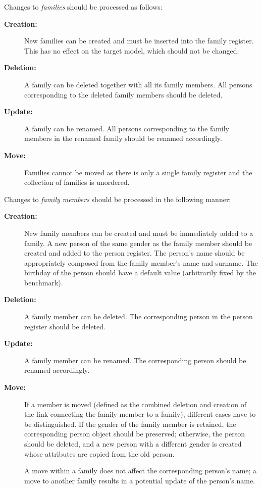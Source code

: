\medskip
\noindent Changes to \emph{families} should be processed as follows:

\begin{description}
    \item[\textbf{Creation:}]
    New families can be created and must be inserted into the family register.
    This has no effect on the target model, which should not be changed.
    
    \item[\textbf{Deletion:}]
    A family can be deleted together with all its family members.
    All persons corresponding to the deleted family members should be deleted.
    
    \item[\textbf{Update:}]
    A family can be renamed.  All persons corresponding to the family members in the renamed family should be renamed accordingly.
    
    \item[\textbf{Move:}]
    Families cannot be moved as there is only a single family register and the collection of families is unordered.
\end{description}

\noindent Changes to \emph{family members} should be processed in the following manner: 

\begin{description}
    \item[\textbf{Creation:}]
    New family members can be created and must be immediately added to a family.
    A new person of the same gender as the family member should be created and added to the person register.
    The person's name should be appropriately composed from the family member's name and surname.
    The birthday of the person should have a default value (arbitrarily fixed by the benchmark). 
    
    \item[\textbf{Deletion:}]
    A family member can be deleted.  The corresponding person in the person register should be deleted.
    
    \item[\textbf{Update:}]
    A family member can be renamed.  The corresponding person should be renamed accordingly.
    
    \item[\textbf{Move:}]
    If a member is moved (defined as the combined deletion and creation of the link connecting the family member to a family), different cases have to be distinguished.
    If the gender of the family member is retained, the corresponding person object should be preserved; otherwise, the person should be deleted, and a new person with a different gender is created whose attributes are copied from the old person. 
    
    A move within a family does not affect the corresponding person's name; a move to another family results in a potential update of the person's name.
\end{description}


